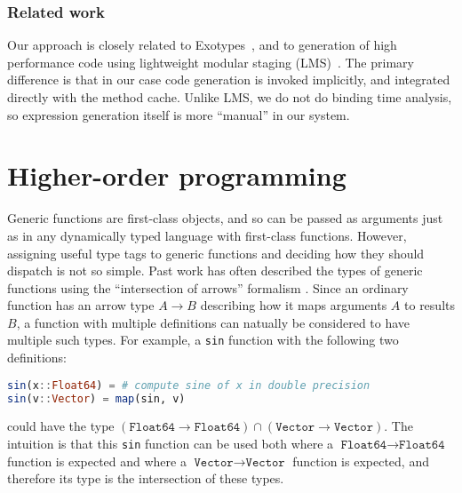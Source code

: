 \subsubsection{Related work}

Our approach is closely related to Exotypes~\cite{DeVito:2014:FRG:2594291.2594307},
and to generation of high performance code using lightweight modular staging
(LMS)~\cite{Rompf:2010:LMS:1868294.1868314,Ofenbeck:2013:SST:2517208.2517228}.
The primary difference is that in our case code generation is invoked
implicitly, and integrated directly with the method cache.
Unlike LMS, we do not do binding time analysis, so expression generation itself
is more ``manual'' in our system.



\section{Higher-order programming}

Generic functions are first-class objects, and so can be passed as arguments
just as in any dynamically typed language with first-class functions.
However, assigning useful type tags to generic functions and deciding how
they should dispatch is not so simple.
Past work has often described the types of generic functions using the
``intersection of arrows'' formalism
\cite{RonchiDellaRocca:1988:PTS:55079.55086, Dunfield:2012:EIU:2364527.2364534,
boundedquant, Castagna:1995:COF:203496.203510}.
Since an ordinary function has an arrow type $A\rightarrow B$ describing how it
maps arguments $A$ to results $B$, a function with multiple definitions can
natually be considered to have multiple such types.
For example, a \texttt{sin} function with the following two definitions:

\begin{singlespace}
\begin{lstlisting}[language=julia]
sin(x::Float64) = # compute sine of x in double precision
sin(v::Vector) = map(sin, v)
\end{lstlisting}
\end{singlespace}

\noindent
could have the type $(\texttt{Float64}\rightarrow\texttt{Float64})\cap(\texttt{Vector}\rightarrow\texttt{Vector})$.
The intuition is that this \texttt{sin} function can be
used both where a $\texttt{Float64}\rightarrow\texttt{Float64}$ function
is expected and where a $\texttt{Vector}\rightarrow\texttt{Vector}$ function is expected,
and therefore its type is the intersection of these types.

